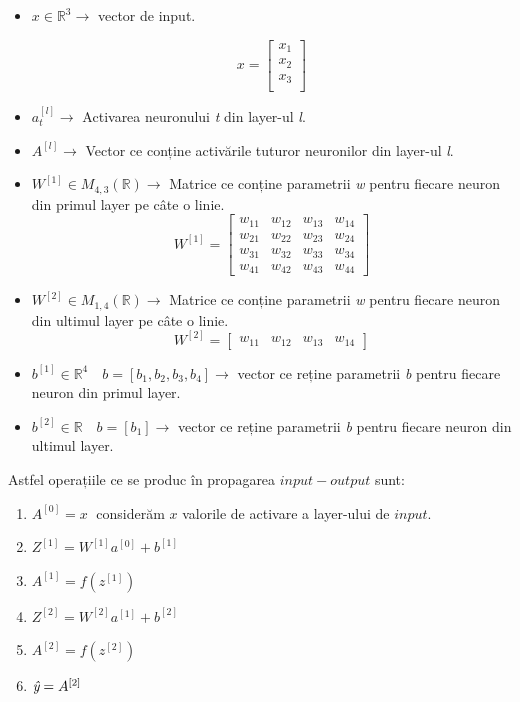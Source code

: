 \begin{itemize}
\item $x \in \mathbb{R}^3 \rightarrow$ vector de input.

\[
x=
\begin{bmatrix}
x_1 \\
x_2 \\
x_3 \\
\end{bmatrix}
\]
 
\item $a_t^{[l]} \rightarrow$ Activarea neuronului \textit{t} din layer-ul \textit{l}.
\item $A^{[l]} \rightarrow$ Vector ce conține activările tuturor neuronilor din layer-ul \textit{l}.
\item $W^{[1]} \in M_{4,3}(\mathbb{R}) \rightarrow$ Matrice ce conține parametrii \textit{w} pentru fiecare neuron din primul layer pe câte o linie. \\

\[
W^{[1]}=
\begin{bmatrix}
    w_{11} & w_{12} & w_{13} & w_{14} \\
    w_{21} & w_{22} & w_{23} & w_{24} \\
    w_{31} & w_{32} & w_{33} & w_{34} \\
    w_{41} & w_{42} & w_{43} & w_{44}
\end{bmatrix}
\]

\item $W^{[2]} \in M_{1,4}(\mathbb{R}) \rightarrow$ Matrice ce conține parametrii \textit{w} pentru fiecare neuron din ultimul layer pe câte o linie. \\

\[
W^{[2]}=
\begin{bmatrix}
    w_{11} & w_{12} & w_{13} & w_{14}
\end{bmatrix}
\]

\item $b^{[1]} \in \mathbb{R}^4 \quad b=[b_1,b_2,b_3,b_4] \rightarrow$ vector ce reține parametrii \textit{b} pentru fiecare neuron din primul layer.

\item $b^{[2]} \in \mathbb{R} \quad b=[b_1] \rightarrow$ vector ce reține parametrii \textit{b} pentru fiecare neuron din ultimul layer.
\end{itemize}

Astfel operațiile ce se produc în propagarea $input-output$ sunt:

\begin{enumerate}
\item $A^{[0]} = x \;$ considerăm $x$ valorile de activare a layer-ului de $input$.
\item $Z^{[1]} = W^{[1]}a^{[0]} + b^{[1]}$
\item $A^{[1]} = f(z^{[1]})$
\item $Z^{[2]} = W^{[2]}a^{[1]} + b^{[2]}$
\item $A^{[2]} = f(z^{[2]})$
\item $\textit{\^{y}}=A^{[2]}$
\end{enumerate}

